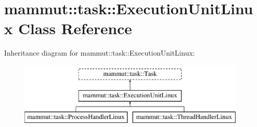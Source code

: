 \hypertarget{classmammut_1_1task_1_1ExecutionUnitLinux}{\section{mammut\-:\-:task\-:\-:Execution\-Unit\-Linux Class Reference}
\label{classmammut_1_1task_1_1ExecutionUnitLinux}
}
Inheritance diagram for mammut\-:\-:task\-:\-:Execution\-Unit\-Linux\-:\begin{figure}[H]
\begin{center}
\leavevmode
\includegraphics[height=3.000000cm]{classmammut_1_1task_1_1ExecutionUnitLinux}
\end{center}
\end{figure}
